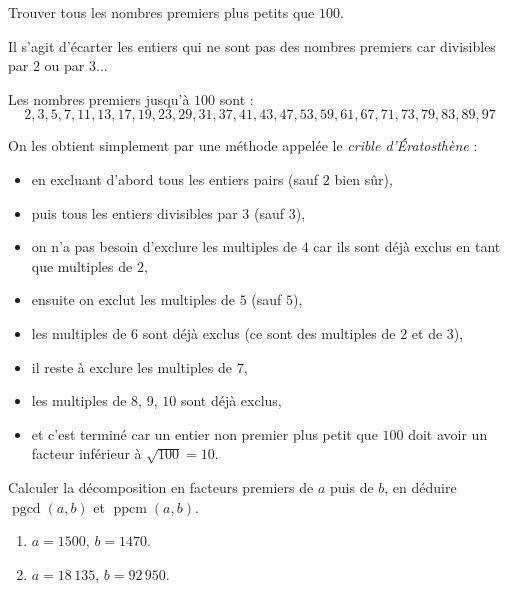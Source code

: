 \documentclass[11pt,class=report,crop=false]{standalone}
\newcommand{\pgcd}{\mathop{\mathrm{pgcd}}\nolimits}
\newcommand{\ppcm}{\mathop{\mathrm{ppcm}}\nolimits}
\begin{document}
    




\bigskip
\bigskip



\exercice{}
\enonce
Trouver tous les nombres premiers plus petits que $100$.
\finenonce

\indication
Il s'agit d'écarter les entiers qui ne sont pas des nombres premiers car divisibles par $2$ ou par $3$...
\finindication

\correction
Les nombres premiers jusqu'à $100$ sont :
$$2, 3, 5, 7, 11, 13, 17, 19, 23, 29, 31, 37, 41, 43, 47, 53, 59, 61, 67, 71, 73, 79, 83, 89, 97$$

On les obtient simplement par une méthode appelée le \emph{crible d'Ératosthène} :
\begin{itemize}
    \item en excluant d'abord tous les entiers pairs (sauf $2$ bien sûr),
    \item puis tous les entiers divisibles par $3$ (sauf $3$),
    \item on n'a pas besoin d'exclure les multiples de $4$ car ils sont déjà exclus en tant que multiples de $2$,
    \item ensuite on exclut les multiples de $5$ (sauf $5$),
    \item les multiples de $6$ sont déjà exclus (ce sont des multiples de $2$ et de $3$),
    \item il reste à exclure les multiples de $7$,
    \item les multiples de $8$, $9$, $10$ sont déjà exclus,
    \item et c'est terminé car un entier non premier plus petit que $100$ doit avoir un facteur inférieur à $\sqrt{100}=10$.
\end{itemize}
\fincorrection
\finexercice



\exercice{}
\enonce
Calculer la décomposition en facteurs premiers de $a$ puis de $b$, en déduire $\pgcd(a,b)$ et $\ppcm(a,b)$.
\begin{enumerate}
    \item $a=1500$, $b=1470$.
    \item $a=18\,135$, $b=92\,950$.
\end{enumerate}
\finenonce
\end{document}
